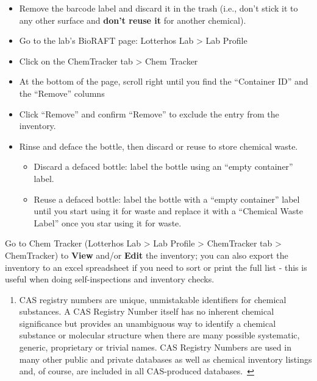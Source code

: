 \documentclass[
  letterpaper,
  DIV=11,
  numbers=noendperiod]{scrreprt}
\providecommand{\tightlist}{%
  \setlength{\itemsep}{0pt}\setlength{\parskip}{0pt}}\usepackage{longtable,booktabs,array}
\begin{document}
\begin{itemize}
\item
  Remove the barcode label and discard it in the trash (i.e., don't
  stick it to any other surface and \textbf{don't reuse it} for another
  chemical).
\item
  Go to the lab's BioRAFT page: Lotterhos Lab \textgreater{} Lab Profile
\item
  Click on the ChemTracker tab \textgreater{} Chem Tracker
\item
  At the bottom of the page, scroll right until you find the ``Container
  ID'' and the ``Remove'' columns
\item
  Click ``Remove'' and confirm ``Remove'' to exclude the entry from the
  inventory.
\item
  Rinse and deface the bottle, then discard or reuse to store chemical
  waste.

  \begin{itemize}
  \item
    Discard a defaced bottle: label the bottle using an ``empty
    container'' label.
  \item
    Reuse a defaced bottle: label the bottle with a ``empty container''
    label until you start using it for waste and replace it with a
    ``Chemical Waste Label'' once you star using it for waste.
  \end{itemize}
\end{itemize}

Go to Chem Tracker (Lotterhos Lab \textgreater{} Lab Profile
\textgreater{} ChemTracker tab \textgreater{} ChemTracker) to
\textbf{View} and/or \textbf{Edit} the inventory; you can also export
the inventory to an excel spreadsheet if you need to sort or print the
full list - this is useful when doing self-inspections and inventory
checks.

\begin{enumerate}
\def\labelenumi{\arabic{enumi}.}
\tightlist
\item
  CAS registry numbers are unique, unmistakable identifiers for chemical
  substances. A CAS Registry Number itself has no inherent chemical
  significance but provides an unambiguous way to identify a chemical
  substance or molecular structure when there are many possible
  systematic, generic, proprietary or trivial names. CAS Registry
  Numbers are used in many other public and private databases as well as
  chemical inventory listings and, of course, are included in all
  CAS-produced
  databases.~\href{https://drk-lo.github.io/lotterhoslabprotocols/general_chemical_inventory/\#fnref:1}{↩}\\
  \strut \\
  \strut \\
  \strut \\
\end{enumerate}
\end{document}
